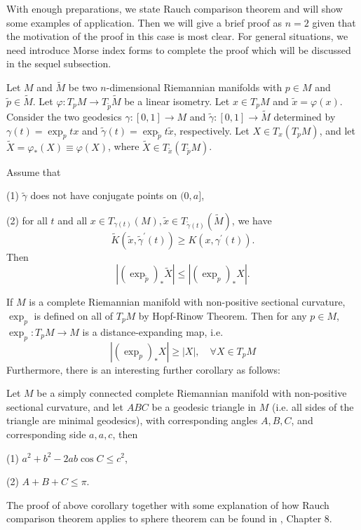 \documentclass{ctexart}
\begin{document}
With enough preparations, we state Rauch comparison theorem and will show some examples of application. Then we will give a brief proof as $n=2$ given that the motivation of the proof 
in this case is most clear. For general situations, we need introduce Morse index forms to complete the proof which will be discussed in the sequel subsection. 

Let $M$ and $\widetilde{M}$ be two $n$-dimensional Riemannian manifolds with $p\in M$ and $\widetilde{p}\in \widetilde{M}$. 
Let $\varphi:T_pM\rightarrow T_{\widetilde{p}}\widetilde{M}$ be a linear isometry. Let $x\in T_pM$ and $\widetilde{x}=\varphi(x)$. 
Consider the two geodesics $\gamma:[0,1]\rightarrow M$ and $\widetilde{\gamma}:[0,1]\rightarrow \widetilde{M}$ determined by 
$\gamma(t)=\exp_{p} t x$ and $\widetilde{\gamma}(t)=\exp_{\widetilde{p}} t \widetilde{x}$, respectively. Let $X\in T_x(T_pM)$, and 
let $\widetilde{X}=\varphi_*(X)\equiv \varphi(X)$, where $\widetilde{X}\in T_{\widetilde{x}}(T_{\widetilde{p}}M)$. 
\begin{theorem}
  Assume that 

  (1) $\tilde{\gamma}$ does not have conjugate points on $(0, a]$, 

  (2) for all $t$ and all $x \in T_{\gamma(t)}(M), \tilde{x} \in T_{\tilde{\gamma}(t)}(\tilde{M})$, we have
  $$
  \tilde{K}\left(\tilde{x}, \tilde{\gamma}^{\prime}(t)\right) \geq K\left(x, \gamma^{\prime}(t)\right). 
  $$
  Then 
  $$
  |(\exp_{\widetilde{p}})_*\widetilde{X}|\leq |(\exp_{p})_* X|.
  $$
\end{theorem}

If $M$ is a complete Riemannian manifold with non-positive sectional curvature, $\exp_p$ is defined on all of $T_pM$ by Hopf-Rinow Theorem. 
Then for any $p \in M$, $\exp_{p}: T_pM \rightarrow M$ is a distance-expanding map, i.e.
$$
\left|(\exp_{p})_* X\right| \geq |X|, \quad \forall X \in T_pM
$$
Furthermore, there is an interesting further corollary as follows:
\begin{corollary}
  Let $M$ be a simply connected complete Riemannian manifold with non-positive sectional curvature, and let $ABC$ be a geodesic triangle in $M$ 
  (i.e. all sides of the triangle are minimal geodesics), with corresponding angles $A, B, C$, and corresponding side $a, a, c$, then 

  (1) $a^2+b^2-2 a b \cos C \leqslant c^2$, 

  (2) $A+B+C \leqslant \pi$. 
\end{corollary}
The proof of above corollary together with some explanation of how Rauch comparison theorem applies to sphere theorem can be found in \cite{WuHongXi2014}, Chapter 8. 
\end{document}
